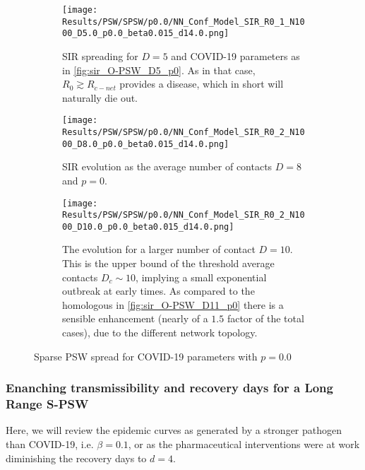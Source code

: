 \documentclass[a4paper,10pt,twoside]{book} %
\theoremstyle{definition}
\begin{document}
\begin{figure}[p]
	\centering
	\begin{subfigure}{\linewidth}
		\centering
		\texttt{[image: Results/PSW/SPSW/p0.0/NN\_Conf\_Model\_SIR\_R0\_1\_N1000\_D5.0\_p0.0\_beta0.015\_d14.0.png]}
		\caption{SIR spreading for $D = 5$ and COVID-19 parameters as in \autoref{fig:sir_O-PSW_D5_p0}. As in that case, $R_0 \gtrsim R_{c-net}$ provides a disease, which in short will naturally die out.}
		\label{fig:sir_S-PSW_D5_p0.0}
	\end{subfigure}
	\vfill	
	\begin{subfigure}{\linewidth}
		\centering
		\texttt{[image: Results/PSW/SPSW/p0.0/NN\_Conf\_Model\_SIR\_R0\_2\_N1000\_D8.0\_p0.0\_beta0.015\_d14.0.png]}
		\caption{SIR evolution as the average number of contacts $ D = 8$ and $ p = 0$.}
		\label{fig:sir_S-PSW_D8_p0.0}
	\end{subfigure}
	\vfill
	\begin{subfigure}{\linewidth}
		\centering
		\texttt{[image: Results/PSW/SPSW/p0.0/NN\_Conf\_Model\_SIR\_R0\_2\_N1000\_D10.0\_p0.0\_beta0.015\_d14.0.png]}
		\caption{The evolution for a larger number of contact $D = 10$. This is the upper bound of the threshold average contacts $ D_c \sim 10$, implying a small exponential outbreak at early times. As compared to the homologous in \autoref{fig:sir_O-PSW_D11_p0} there is a sensible enhancement (nearly of a $1.5$ factor of the total cases), due to the different network topology.}
		\label{fig:sir_S-PSW_D10_p0.0}
	\end{subfigure}
	\caption{Sparse PSW spread for COVID-19 parameters with $p = 0.0$ }
	\label{fig:sir_SPSW_COVID}
\end{figure}

\clearpage
\subsubsection*{Enanching transmissibility and recovery days for a Long Range S-PSW}
Here, we will review the epidemic curves as generated by a stronger pathogen than COVID-19, i.e. $ \beta = 0.1$, or as the pharmaceutical interventions were at work diminishing the recovery days to $d = 4$.
\end{document}
